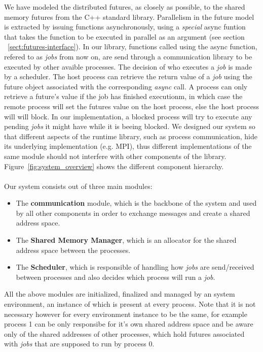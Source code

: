 We have modeled the distributed futures, as closely as possible, 
to the shared memory futures from the C++ standard library.  Parallelism in the future
model is extracted by issuing functions asynchronously, using a \emph{special} async funtion
that takes the function to be executed in parallel as an argument (see section ~\ref{sect:futures-interface}).
In our library, functions called using the async function,
refered to as \emph{jobs} from now on, are send through a communication library 
to be executed by other avaible processes.  
The decision of who executes a \emph{job} is made by a scheduler.  The host process can retrieve
the return value of a \emph{job} using the future object associated with the corresponding \emph{async} call.
A process can only retrieve a future's value if the job has finished executionm, in which case the remote 
process will set the futures value on the host process, else the host process will will block.
In our implementation, a blocked process will try to execute any pending \emph{jobs} it might have
while it is beeing blocked.
		We designed our system so that different aspects of the runtime library, such as process
communication, hide its underlying implementation (e.g. MPI),  thus different implementations 
of the same module should not interfere with other components of the library.
Figure~\ref{fig:system_overview} shows the different component hierarchy.\\
\\
Our system consists out of three main modules:
\begin{itemize}
	\item The \textbf{communication} module, which is the backbone of the system
	and used by all other components in order to exchange messages and create a shared address space.

	\item The \textbf{Shared Memory Manager}, which is an allocator for the shared address space between the processes.

	\item The \textbf{Scheduler}, which is responsible of handling how \emph{jobs} are send/received between processes
	and also decides which process will run a \emph{job}.
\end{itemize}

\vfill

All the above modules are initialized, finalized and managed by an system environment, 
an instance of which is present
at every process.  Note that it is not necessary however for every environment instance to be the same, for
example process 1 can be only responsibe for it's own shared address space and be aware only of the shared
addresses of other processes, which hold futures associated with \emph{jobs} that are supposed to run by
process 0.

